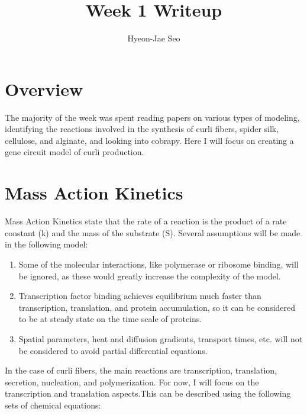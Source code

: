 \documentclass[11pt, oneside]{article}   	%
\title{Week 1 Writeup}
\author{Hyeon-Jae Seo}
\begin{document}
\maketitle

\section{Overview}
The majority of the week was spent reading papers on various types of modeling, identifying the reactions involved in the synthesis of curli fibers, spider silk, cellulose, and alginate, and looking into cobrapy. Here I will focus on creating a gene circuit model of curli production.

\section{Mass Action Kinetics}
Mass Action Kinetics state that the rate of a reaction is the product of a rate constant (k) and the mass of the substrate (S). Several assumptions will be made in the following model:

\begin{enumerate}
	\item Some of the molecular interactions, like polymerase or ribosome binding, will be ignored, as these would greatly increase the complexity of the model.
	\item Transcription factor binding achieves equilibrium much faster than transcription, translation, and protein accumulation, so it can be considered to be at steady state on the time scale of proteins. 
	\item Spatial parameters, heat and diffusion gradients, transport times, etc. will not be considered to avoid partial differential equations.
\end{enumerate}

In the case of curli fibers, the main reactions are transcription, translation, secretion, nucleation, and polymerization. For now, I will focus on the transcription and translation aspects.This can be described using the following sets of chemical equations: 
\end{document}
